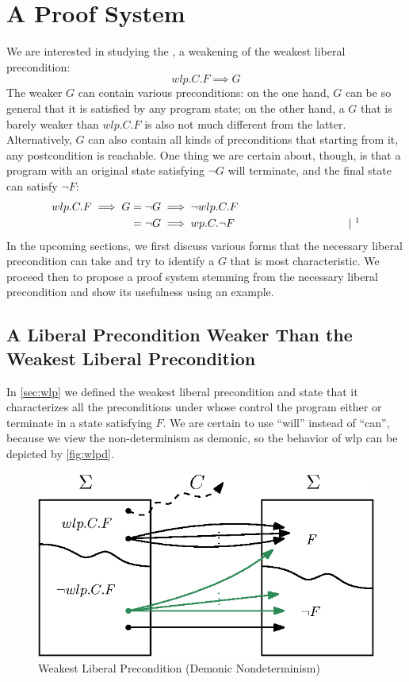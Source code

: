 \chapter{A Proof System}\label{ch:system} %
We are interested in studying the , a weakening of the weakest liberal precondition: 
$$wlp.C.F\implies G$$
The weaker $G$ can contain various preconditions: on the one hand, $G$ can be so general that it is satisfied by any program state; on the other hand, a $G$ that is barely weaker than $wlp.C.F$ is also not much different from the latter. 
Alternatively, $G$ can also contain all kinds of preconditions that starting from it, any postcondition is reachable. 
One thing we are certain about, though, is that a program with an original state satisfying $\neg G$ will terminate, and the final state can satisfy $\neg F$: 
\begin{align*}
wlp.C.F\implies G & = \neg G \implies \neg wlp.C.F \\
	& = \neg G \implies wp.C.\neg F 
	\hspace{0.3\textwidth} | \ \todo{insert theorem: wlp and wp are conjugates} 
\end{align*}
In the upcoming sections, we first discuss various forms that the necessary liberal precondition can take and try to identify a $G$ that is most characteristic. 
We proceed then to propose a proof system stemming from the necessary liberal precondition and show its usefulness using an example.  

\section{A Liberal Precondition Weaker Than the Weakest Liberal Precondition }
In \autoref{sec:wlp} we defined the weakest liberal precondition and state that it characterizes all the preconditions under whose control the program either  or  terminate in a state satisfying $F$. 
We are certain to use ``will'' instead of ``can'', because we view the non-determinism as demonic, so the behavior of wlp can be depicted by \autoref{fig:wlpd}. 

\begin{figure}[ht!]\centering
\includegraphics[width=\textwidth]{image/wlpd.eps}
\caption{Weakest Liberal Precondition (Demonic Nondeterminism) }
\label{fig:wlpd}
\end{figure}


